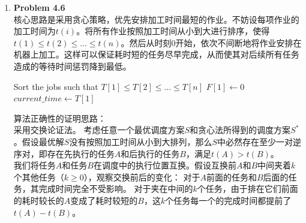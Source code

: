 \documentclass{ctexart}
\begin{document}
\begin{enumerate}[label=\arabic*.]
\begin{algorithm}[H]
{                
            }
            \;
        \end{algorithm}
        算法正确性的证明思路：\\
        考虑一个最优解$S$和贪心法所得到的最优解$S^*$，考虑第一个基站的位置，必然有$S^*_1\ge S_1$。（否则第一个房子不会有基站覆盖。）
        因此，将$S_1$变成$S^*_1$，不影响最优解性质。由此进行归纳，假设替换了前$t$个基站（其中$t<k$）。对于下一个基站$S_{t+1}$，
        考虑$S^*$的下一个基站$S^*_{t+1}$，自然有$S_{t+1}\le S^*_{t+1}$，因此同样可以替换$t+1$个基站并且使得结果不会变差。
        因此由归纳法，可以证明任意最优解可以经过有限步（至多$k$步）变成贪心法的最优解。
    \item \textbf{Problem 4.6}\\
        核心思路是采用贪心策略，优先安排加工时间最短的作业。不妨设每项作业的加工时间为$t(i)$。将所有作业按照加工时间从小到大进行排序，使得$t(1) \le t(2) \le \dots \le t(n)$。然后从时刻$0$开始，依次不间断地将作业安排在机器上加工。这样可以保证耗时短的任务尽早完成，从而使其对后续所有任务造成的等待时间惩罚降到最低。\\
        \begin{algorithm}[H]
            \caption{贪心法求解最小平均完成时间调度问题}
            Sort the jobs such that $T[1] \le T[2] \le \dots \le T[n]$\;
            $F[1] \leftarrow 0$\;
            $current\_time \leftarrow T[1]$\;
            \;
        \end{algorithm}
        算法正确性的证明思路：\\
        采用交换论证法。
        考虑任意一个最优调度方案$S$和贪心法所得到的调度方案$S^*$。假设最优解$S$没有按照加工时间从小到大排列，那么$S$中必然存在至少一对逆序对，即存在先执行的任务$A$和后执行的任务$B$，满足$t(A) > t(B)$。\\
        我们将任务$A$和任务$B$在调度中的执行位置互换。假设互换前$A$和$B$中间夹着$k$个其他任务（$k \ge 0$），观察交换前后的变化：
        对于$A$前面的任务和$B$后面的任务，其完成时间完全不受影响。
        对于夹在中间的$k$个任务，由于排在它们前面的耗时较长的$A$变成了耗时较短的$B$，这$k$个任务每一个的完成时间都提前了$t(A)-t(B)$。

\end{enumerate}
\end{document}
